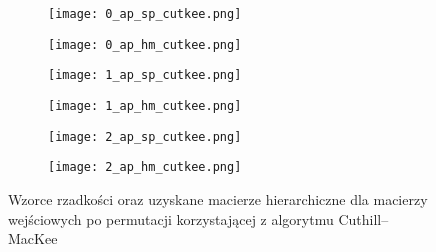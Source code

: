 \documentclass{../myclass}
\begin{document}
\begin{figure}
    \centering
    \begin{subfigure}[b]{0.45\textwidth}
        \centering
        \texttt{[image: 0\_ap\_sp\_cutkee.png]}
    \end{subfigure}
    \hfill
    \begin{subfigure}[b]{0.45\textwidth}
        \centering
        \texttt{[image: 0\_ap\_hm\_cutkee.png]}
    \end{subfigure}
    \vfill
    \centering
    \begin{subfigure}[b]{0.45\textwidth}
        \centering
        \texttt{[image: 1\_ap\_sp\_cutkee.png]}
    \end{subfigure}
    \hfill
    \begin{subfigure}[b]{0.45\textwidth}
        \centering
        \texttt{[image: 1\_ap\_hm\_cutkee.png]}
    \end{subfigure}
    \vfill
    \centering
    \begin{subfigure}[b]{0.45\textwidth}
        \centering
        \texttt{[image: 2\_ap\_sp\_cutkee.png]}
    \end{subfigure}
    \hfill
    \begin{subfigure}[b]{0.45\textwidth}
        \centering
        \texttt{[image: 2\_ap\_hm\_cutkee.png]}
    \end{subfigure}
    \caption{Wzorce rzadkości oraz uzyskane macierze hierarchiczne dla macierzy wejściowych po permutacji korzystającej z algorytmu Cuthill--MacKee}
    \label{Fig:3}
\end{figure}
\end{document}
